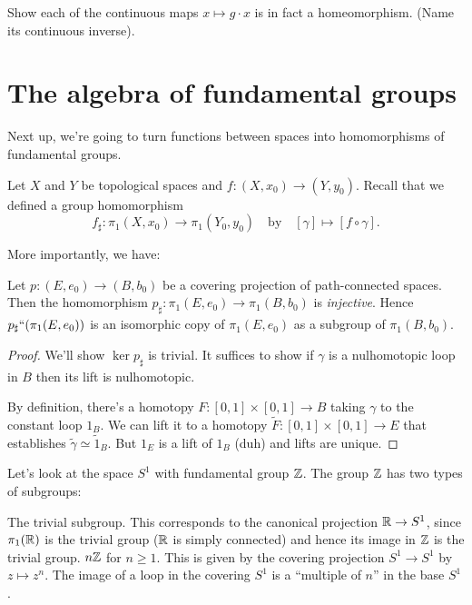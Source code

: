 \begin{ques}
	Show each of the continuous maps $x \mapsto g \cdot x$ is in fact a homeomorphism.
	(Name its continuous inverse).
\end{ques}

\section{The algebra of fundamental groups}
Next up, we're going to turn functions between spaces into homomorphisms of fundamental groups.

Let $X$ and $Y$ be topological spaces and $f : (X, x_0) \to (Y, y_0)$.
Recall that we defined a group homomorphism
\[ f_\sharp : \pi_1(X, x_0) \to \pi_1(Y_0, y_0) 
	\quad\text{by}\quad
	[\gamma] \mapsto [f \circ \gamma]. \]

More importantly, we have:
\begin{proposition}
	Let $p : (E,e_0) \to (B,b_0)$ be a covering projection of path-connected spaces.
	Then the homomorphism $p_\sharp : \pi_1(E, e_0) \to \pi_1(B, b_0)$ is \emph{injective}.
	Hence $p_\sharp ``(\pi_1(E, e_0))$ is an isomorphic copy of $\pi_1(E, e_0)$ 
	as a subgroup of $\pi_1(B, b_0)$.
\end{proposition}
\begin{proof}
	We'll show $\ker p_\sharp$ is trivial.
	It suffices to show if $\gamma$ is a nulhomotopic loop in $B$ 
	then its lift is nulhomotopic.

	By definition, there's a homotopy $F : [0,1] \times [0,1] \to B$
	taking $\gamma$ to the constant loop $1_B$.
	We can lift it to a homotopy $\tilde F : [0,1] \times [0,1] \to E$
	that establishes $\tilde\gamma \simeq \tilde 1_B$.
	But $1_E$ is a lift of $1_B$ (duh) and lifts are unique.
\end{proof}

\begin{example}[Subgroups of $\ZZ$]
	Let's look at the space $S^1$ with fundamental group $\ZZ$.
	The group $\ZZ$ has two types of subgroups:
	\begin{itemize}
		\ii The trivial subgroup.
		This corresponds to the canonical projection $\mathbb R \to S^1$,
		since $\pi_1(\mathbb R)$ is the trivial group ($\mathbb R$ is simply connected)
		and hence its image in $\ZZ$ is the trivial group.
		\ii $n\mathbb Z$ for $n \ge 1$.
		This is given by the covering projection $S^1 \to S^1$
		by $z \mapsto z^n$.
		The image of a loop in the covering $S^1$ is a ``multiple of $n$''
		in the base $S^1$.
	\end{itemize}
\end{example}

